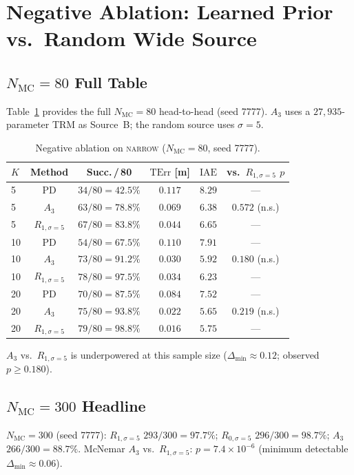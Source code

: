 \documentclass[11pt,a4paper]{article}
\newcommand{\Nm}{N_{\mathrm{MC}}}
\newcommand{\TErr}{\mathrm{TErr}}
\newcommand{\IAE}{\mathrm{IAE}}
\begin{document}
\section{Negative Ablation: Learned Prior vs.\ Random Wide Source}
\label{sec:S3}

\subsection{$\Nm = 80$ Full Table}
Table~\ref{tab:s3-negabl} provides the full $\Nm = 80$ head-to-head
(seed 7777). $A_3$ uses a $27{,}935$-parameter TRM as Source~B; the
random source uses $\sigma = 5$.
\begin{table}[h]
\centering
\caption{Negative ablation on \textsc{narrow} ($\Nm = 80$, seed 7777).}\label{tab:s3-negabl}
\begin{tabular}{lccccc}
\toprule
$K$ & Method & Succ.\,/\,80 & $\TErr$ [m] & $\IAE$ & vs.\ $R_{1,\sigma=5}$ $p$ \\
\midrule
5  & PD          & $34/80 = 42.5\%$  & $0.117$ & $8.29$ & --- \\
5  & $A_3$       & $63/80 = 78.8\%$  & $0.069$ & $6.38$ & $0.572$ (n.s.) \\
5  & $R_{1,\sigma=5}$ & $67/80 = 83.8\%$  & $0.044$ & $6.65$ & --- \\
\midrule
10 & PD          & $54/80 = 67.5\%$  & $0.110$ & $7.91$ & --- \\
10 & $A_3$       & $73/80 = 91.2\%$  & $0.030$ & $5.92$ & $0.180$ (n.s.) \\
10 & $R_{1,\sigma=5}$ & $78/80 = 97.5\%$  & $0.034$ & $6.23$ & --- \\
\midrule
20 & PD          & $70/80 = 87.5\%$  & $0.084$ & $7.52$ & --- \\
20 & $A_3$       & $75/80 = 93.8\%$  & $0.022$ & $5.65$ & $0.219$ (n.s.) \\
20 & $R_{1,\sigma=5}$ & $79/80 = 98.8\%$  & $0.016$ & $5.75$ & --- \\
\bottomrule
\end{tabular}
\par\smallskip
$A_3$ vs.\ $R_{1,\sigma=5}$ is underpowered at this sample size
($\Delta_{\min} \approx 0.12$; observed $p \ge 0.180$).
\end{table}

\subsection{$\Nm = 300$ Headline}
$\Nm = 300$ (seed 7777): $R_{1,\sigma=5}$ $293/300 = 97.7\%$;
$R_{0,\sigma=5}$ $296/300 = 98.7\%$; $A_3$ $266/300 = 88.7\%$.
McNemar $A_3$ vs.\ $R_{1,\sigma=5}$: $p = 7.4 \times 10^{-6}$
(minimum detectable $\Delta_{\min} \approx 0.06$).
\end{document}
